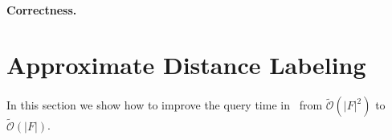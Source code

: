 \documentclass[11pt]{article}
\theoremstyle{plain}
\newcommand{\cO}{\mathcal{O}}
\newcommand{\cOtilde}{\tilde{\cO}}
\begin{document}
\paragraph{Correctness.}




\section{Approximate Distance Labeling}\label{sec:approx}
In this section we show how to improve the query time in~\cite{DBLP:conf/stoc/AbrahamCG12} from $\cOtilde(|F|^2)$ to $\cOtilde(|F|)$.



\end{document}
